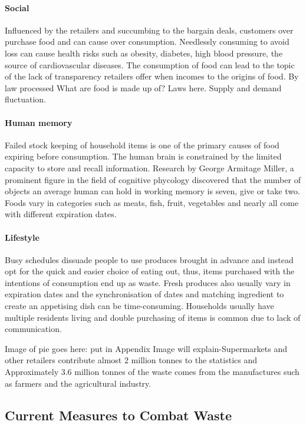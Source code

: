 \documentclass[a4paper, 11pt]{article}
\begin{document}
\paragraph{Social}Influenced by the retailers and succumbing to the bargain deals, customers over purchase food and can cause over consumption. Needlessly consuming to avoid loss can cause health risks such as obesity, diabetes, high blood pressure, the source of cardiovascular diseases. The consumption of food can lead to the topic of the lack of transparency retailers offer when incomes to the origins of food. By law processed What are food is made up of? Laws here. Supply and demand fluctuation.

\paragraph{Human memory}Failed stock keeping of household items is one of the primary causes of food expiring before consumption. The human brain is constrained by the limited capacity to store and recall information. Research by George Armitage Miller, a prominent figure in the field of cognitive phycology discovered that the number of objects an average human can hold in working memory is seven, give or take two.\cite{2} Foods vary in categories such as meats, fish, fruit, vegetables and nearly all come with different expiration dates. 


\paragraph{Lifestyle}Busy schedules dissuade people to use produces brought in advance and instead opt for the quick and easier choice of eating out, thus, items purchased with the intentions of consumption end up as waste. Fresh produces also usually vary in expiration dates and the synchronisation of dates and matching ingredient to create an appetising dish can be time-consuming. Households usually have multiple residents living and double purchasing of items is common due to lack of communication. 

\vspace{\baselineskip}
Image of pie goes here: put in Appendix Image will explain-Supermarkets and other retailers contribute almost 2 million tonnes to the statistics and Approximately 3.6 million tonnes of the waste comes from the manufactures such as farmers and the agricultural industry.


\subsection{Current Measures to Combat Waste}
\end{document}
